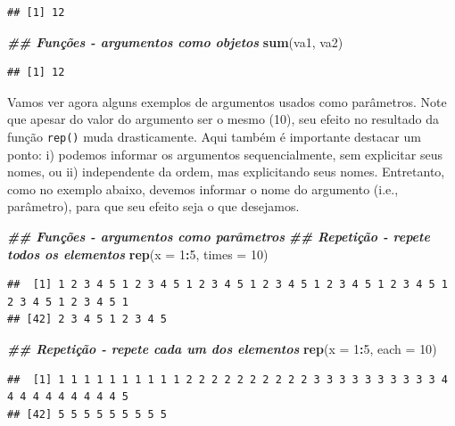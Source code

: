 \documentclass[
]{article}
\newenvironment{Shaded}{\begin{snugshade}}{\end{snugshade}}
\newcommand{\AttributeTok}[1]{\textcolor[rgb]{0.13,0.29,0.53}{#1}}
\newcommand{\DecValTok}[1]{\textcolor[rgb]{0.00,0.00,0.81}{#1}}
\newcommand{\DocumentationTok}[1]{\textcolor[rgb]{0.56,0.35,0.01}{\textbf{\textit{#1}}}}
\newcommand{\FunctionTok}[1]{\textcolor[rgb]{0.13,0.29,0.53}{\textbf{#1}}}
\newcommand{\NormalTok}[1]{#1}
\newcommand{\SpecialCharTok}[1]{\textcolor[rgb]{0.81,0.36,0.00}{\textbf{#1}}}
\begin{document}
\begin{verbatim}
## [1] 12
\end{verbatim}

\begin{Shaded}
\begin{Highlighting}[]
\DocumentationTok{\#\# Funções {-} argumentos como objetos}
\FunctionTok{sum}\NormalTok{(va1, va2)}
\end{Highlighting}
\end{Shaded}

\begin{verbatim}
## [1] 12
\end{verbatim}

Vamos ver agora alguns exemplos de argumentos usados como parâmetros. Note que apesar do valor do argumento ser o mesmo (10), seu efeito no resultado da função \texttt{rep()} muda drasticamente. Aqui também é importante destacar um ponto: i) podemos informar os argumentos sequencialmente, sem explicitar seus nomes, ou ii) independente da ordem, mas explicitando seus nomes. Entretanto, como no exemplo abaixo, devemos informar o nome do argumento (i.e., parâmetro), para que seu efeito seja o que desejamos.

\begin{Shaded}
\begin{Highlighting}[]
\DocumentationTok{\#\# Funções {-} argumentos como parâmetros}
\DocumentationTok{\#\# Repetição {-} repete todos os elementos}
\FunctionTok{rep}\NormalTok{(}\AttributeTok{x =} \DecValTok{1}\SpecialCharTok{:}\DecValTok{5}\NormalTok{, }\AttributeTok{times =} \DecValTok{10}\NormalTok{)}
\end{Highlighting}
\end{Shaded}

\begin{verbatim}
##  [1] 1 2 3 4 5 1 2 3 4 5 1 2 3 4 5 1 2 3 4 5 1 2 3 4 5 1 2 3 4 5 1 2 3 4 5 1 2 3 4 5 1
## [42] 2 3 4 5 1 2 3 4 5
\end{verbatim}

\begin{Shaded}
\begin{Highlighting}[]
\DocumentationTok{\#\# Repetição {-} repete cada um dos elementos}
\FunctionTok{rep}\NormalTok{(}\AttributeTok{x =} \DecValTok{1}\SpecialCharTok{:}\DecValTok{5}\NormalTok{, }\AttributeTok{each =} \DecValTok{10}\NormalTok{)}
\end{Highlighting}
\end{Shaded}

\begin{verbatim}
##  [1] 1 1 1 1 1 1 1 1 1 1 2 2 2 2 2 2 2 2 2 2 3 3 3 3 3 3 3 3 3 3 4 4 4 4 4 4 4 4 4 4 5
## [42] 5 5 5 5 5 5 5 5 5
\end{verbatim}
\end{document}
